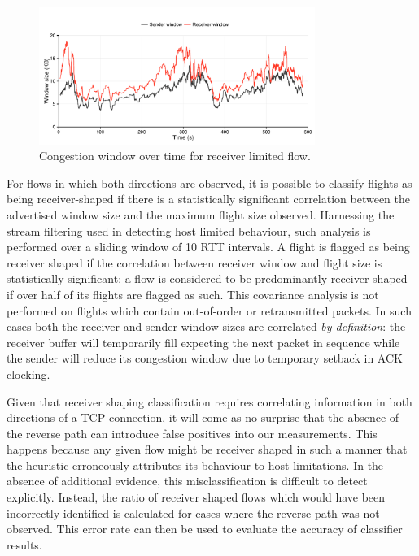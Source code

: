 \begin{figure}
\centering
  \includegraphics[width=0.8\textwidth]{figures/malawi/awnd.pdf}
  \caption{Congestion window over time for receiver limited flow. \label{fig:awnd}}
\end{figure}

For flows in which both directions are observed, it is possible to classify flights as being receiver-shaped if there is a statistically significant correlation between the advertised window size and the maximum flight size observed.
Harnessing the stream filtering used in detecting host limited behaviour, such analysis is performed over a sliding window of 10 \ac{RTT} intervals.
A flight is flagged as being receiver shaped if the correlation between receiver window and flight size is statistically significant; a flow is considered to be predominantly receiver shaped if over half of its flights are flagged as such.
This covariance analysis is not performed on flights which contain out-of-order or retransmitted packets. 
In such cases both the receiver and sender window sizes are correlated \emph{by definition}: the receiver buffer will temporarily fill expecting the next packet in sequence while the sender will reduce its congestion window due to temporary setback in \ac{ACK} clocking.

Given that receiver shaping classification requires correlating information in both directions of a \ac{TCP} connection, it will come as no surprise that the absence of the reverse path can introduce false positives into our measurements. 
This happens because any given flow might be receiver shaped in such a manner that the heuristic erroneously attributes its behaviour to host limitations. 
In the absence of additional evidence, this misclassification is difficult to detect explicitly. 
Instead, the ratio of receiver shaped flows which would have been incorrectly identified is calculated for cases where the reverse path was not observed. 
This error rate can then be used to evaluate the accuracy of classifier results.
